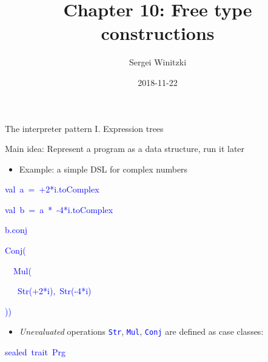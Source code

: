 \documentclass[english,,russian]{beamer}
\title[Chapter 10: Free type constructions]{Chapter 10: Free type constructions}
\author{Sergei Winitzki}
\date{2018-11-22}
\institute[ABTB]{Academy by the Bay}
\newenvironment{lyxcode}
  {\par\begin{list}{}{
    \setlength{\rightmargin}{\leftmargin}
    \setlength{\listparindent}{0pt}%
    \raggedright
    \setlength{\itemsep}{0pt}
    \setlength{\parsep}{0pt}
    \normalfont\ttfamily}%
   \def\{{\char`\{}
   \def\}{\char`\}}
   \def\textasciitilde{\char`\~}
   \item[]}
  {\end{list}}
\begin{document}
\frame{\titlepage}
\begin{frame}{The interpreter pattern I. Expression trees}

Main idea: Represent a program as a data structure, run it later
\begin{itemize}
\item Example: a simple DSL for complex numbers
\end{itemize}
\vspace{-0.35cm}%
\begin{minipage}[t]{0.35\columnwidth}%
\begin{lyxcode}
\textcolor{blue}{\footnotesize{}val~a~=~+2{*}i\textquotedbl .toComplex}{\footnotesize\par}

\textcolor{blue}{\footnotesize{}val~b~=~a~{*}~-4{*}i\textquotedbl .toComplex}{\footnotesize\par}

\textcolor{blue}{\footnotesize{}b.conj}{\footnotesize\par}
\end{lyxcode}
%
\end{minipage}\hspace*{\fill}%
\begin{minipage}[t]{0.45\columnwidth}%
\begin{lyxcode}
\textcolor{blue}{\footnotesize{}Conj(}{\footnotesize\par}

\textcolor{blue}{\footnotesize{}~~Mul(}{\footnotesize\par}

\textcolor{blue}{\footnotesize{}~~~Str(+2{*}i\textquotedbl ),~Str(-4{*}i\textquotedbl )}{\footnotesize\par}

\textcolor{blue}{\footnotesize{}))}{\footnotesize\par}
\end{lyxcode}
%
\end{minipage}\hspace*{\fill}
\begin{itemize}
\item \emph{Unevaluated} operations \texttt{\textcolor{blue}{\footnotesize{}Str}},
\texttt{\textcolor{blue}{\footnotesize{}Mul}}, \texttt{\textcolor{blue}{\footnotesize{}Conj}}
are defined as case classes:
\end{itemize}
\begin{lyxcode}
\textcolor{blue}{\footnotesize{}sealed~trait~Prg}{\footnotesize\par}


\end{lyxcode}
\end{frame}
\end{document}
